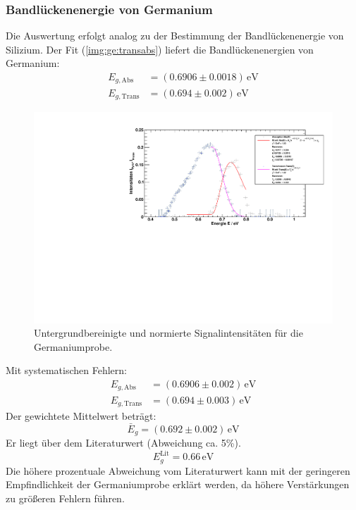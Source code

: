 \subsubsection{Bandlückenenergie von Germanium}
Die Auswertung erfolgt analog zu der Bestimmung der Bandlückenenergie von Silizium. Der Fit (\autoref{img:ge:transabs})
liefert die Bandlückenenergien von Germanium:
\begin{equation}
\begin{split}
  E_{g, \text{Abs}} &= (0.6906 \pm 0.0018)\,\text{eV} \\
  E_{g, \text{Trans}} &= (0.694 \pm 0.002)\,\text{eV}
\end{split}
\end{equation}
\begin{figure}[H]
\begin{center}
  \includegraphics[width=\textwidth]{../img/part1/Ge_fit_AbsTrans.pdf}
  \caption{Untergrundbereinigte und normierte Signalintensitäten für die Germaniumprobe.}
  \label{img:ge:transabs}
\end{center}
\end{figure}
Mit systematischen Fehlern:
\begin{equation}
\begin{split}
  E_{g, \text{Abs}} &= (0.6906 \pm 0.002)\,\text{eV} \\
  E_{g, \text{Trans}} &= (0.694 \pm 0.003)\,\text{eV}
\end{split}
\end{equation}
Der gewichtete Mittelwert beträgt:
\begin{equation}
  \bar{E}_g = (0.692 \pm 0.002)\,\text{eV}
\end{equation}
Er liegt über dem Literaturwert (Abweichung ca. 5\%).
\begin{equation}
  E_g^{\text{Lit}} = 0.66\,\text{eV}
\end{equation}
Die höhere prozentuale Abweichung vom Literaturwert kann mit der geringeren Empfindlichkeit der Germaniumprobe erklärt werden, da höhere 
Verstärkungen zu größeren Fehlern führen.

